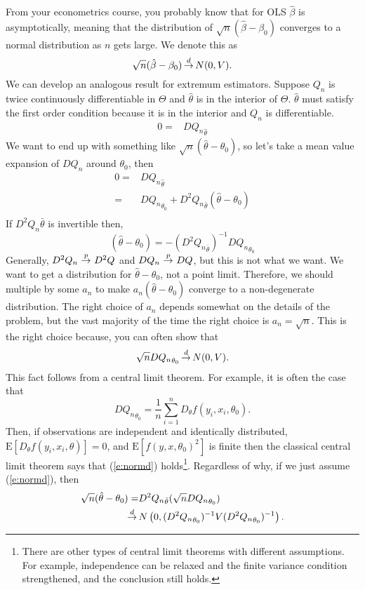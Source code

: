 \documentclass[12pt,reqno]{amsart}
\theoremstyle{definition}
\def\inprobHIGH{\,{\buildrel p \over \rightarrow}\,}
\def\inprob{\,{\inprobHIGH}\,}
\def\indist{\,{\buildrel d \over \rightarrow}\,}
\providecommand{\Er}{{\mathrm{E}}}
\begin{document}
From your econometrics course, you probably know that for OLS
$\hat{\beta}$ is asymptotically, meaning that the distribution of
$\sqrt{n}(\hat{\beta} - \beta_0)$ converges to a normal distribution
as $n$ gets large. We denote this as
\[ \sqrt{n}(\hat{\beta} - \beta_0) \indist N(0,V). \]
We can develop an analogous result for extremum estimators. Suppose
$Q_n$ is twice continuously differentiable in $\Theta$ and
$\hat{\theta}$ is in the interior of $\Theta$. $\hat{\theta}$ must
satisfy the first order condition because it is in the interior and
$Q_n$ is differentiable. 
\begin{align*}
  0 = & D {Q_n}_{\hat{\theta}} 
\end{align*}
We want to end up with something like $\sqrt{n}(\hat{\theta} -
\theta_0)$, so let's take a mean value expansion of $DQ_n$ around
$\theta_0$, then
\begin{align*}
  0 = & D {Q_n}_{\hat{\theta}} \\
  = & D{Q_n}_{\theta_0} + D^2
  {Q_n}_{\bar{\theta}} (\hat{\theta} - \theta_0) \\
\end{align*}
If $D^2Q_n{\bar{\theta}}$ is invertible then,
\[ (\hat{\theta} - \theta_0) =  -(D^2{Q_n}_{\bar{\theta}} )^{-1}
D{Q_n}_{\theta_0} \]   
Generally, $D^2 Q_n \inprob D^2 Q$ and $DQ_n \inprob DQ$, but this is not
what we want. We want to get a distribution for
$\hat{\theta}-\theta_0$, not a point limit. Therefore, we should
multiple by some $a_n$ to make $a_n(\hat{\theta}-\theta_0)$ converge
to a non-degenerate distribution. The right choice of $a_n$ depends
somewhat on the details of the problem, but the vast majority of the
time the right choice is $a_n = \sqrt{n}$. This is the right choice
because, you can often show that
\begin{align} 
  \sqrt{n} {DQ_n}_{\theta_0} \indist N(0,V). \label{e:normd} 
\end{align}
This fact follows from a central limit theorem. For example, it is
often the case that 
\[ D{Q_n}_{\theta_0} = \frac{1}{n} \sum_{i=1}^n D_\theta
f(y_i,x_i,\theta_0). \] Then, if observations are independent and
identically distributed, $\Er[D_\theta f(y_i,x_i,\theta)] = 0$, and
$\Er[f(y,x,\theta_0)^2]$ is finite then the classical central limit
theorem says that (\ref{e:normd}) holds\footnote{There are other types
  of central limit theorems with different assumptions. For example,
  independence can be relaxed and the finite variance condition
  strengthened, and the conclusion still holds.}. Regardless of why,
if we just assume (\ref{e:normd}), then
\begin{align*}
  \sqrt{n}(\hat{\theta} - \theta_0) = & D^2 {Q_n}_{\bar{\theta}}
  (\sqrt{n} D {Q_n}_{\theta_0} ) \\
  \indist & N\left(0, (D^2 {Q_n}_{\theta_0})^{-1} V (D^2
    {Q_n}_{\theta_0})^{-1} \right).
\end{align*}
\end{document}
